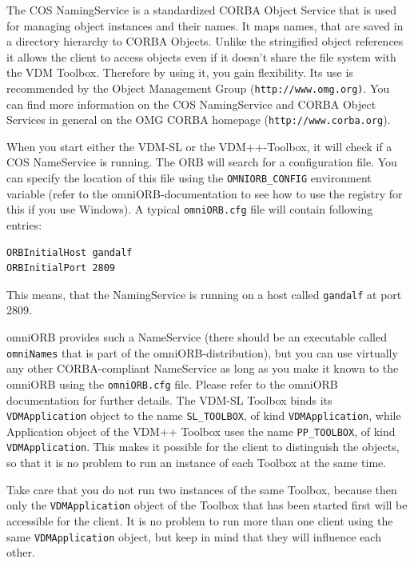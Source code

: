 \documentclass[\pformat,12pt]{article}
\begin{document}
The COS NamingService is a standardized CORBA Object Service that
is used for managing object instances and their names. It maps
names, that are saved in a directory hierarchy to CORBA Objects.
Unlike the stringified object references it allows the client
to access objects even if it doesn't share the file system with
the VDM Toolbox. Therefore by using it, you gain flexibility. Its
use is recommended by the Object Management Group (\texttt{http://www.omg.org)}.
You can find more information on the COS NamingService and 
CORBA Object Services in general on the OMG CORBA homepage 
(\texttt{http://www.corba.org}).

When you start either the VDM-SL or the VDM++-Toolbox, it will
check if a COS NameService is running. The ORB will search for
a configuration file. You can specify the location of this
file using the {\tt OMNIORB\_CONFIG} environment variable (refer
to the omniORB-documentation to see how to use the registry for
this if you use Windows). A typical {\tt omniORB.cfg} file
will contain following entries:

\begin{verbatim}
ORBInitialHost gandalf
ORBInitialPort 2809
\end{verbatim}

This means, that the NamingService is running on a host
called {\tt gandalf} at port 2809.

omniORB provides such a
NameService (there should be an executable called \texttt{omniNames}
that is part of the omniORB-distribution), but you can use
virtually any other CORBA-compliant NameService as long as you
make it known to the omniORB using the \texttt{omniORB.cfg} file.
Please refer to the omniORB documentation for further details.
The VDM-SL Toolbox binds its {\tt VDMApplication} object to the name
{\tt SL\_TOOLBOX}, of kind {\tt VDMApplication}, while Application object of the
VDM++ Toolbox uses the name {\tt PP\_TOOLBOX}, of kind {\tt VDMApplication}. This
makes it possible for the client to distinguish the objects, so
that it is no problem to run an instance of each Toolbox at the
same time. 

Take care that you do not run two instances of the
same Toolbox, because then only the {\tt VDMApplication} object
of the Toolbox that has been started first will be accessible
for the client. It is no problem to run more than one client
using the same {\tt VDMApplication} object, but keep in mind
that they will influence each other.
\end{document}

